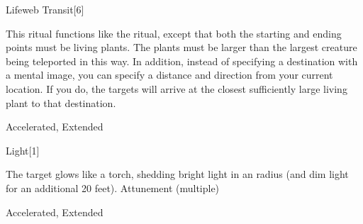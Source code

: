 \begin{spellsection}{Lifeweb Transit}[6]
\begin{spellcontent}
\begin{spelltargetinginfo}
\end{spelltargetinginfo}
\begin{spelleffects}
\spelleffect
This ritual functions like the  ritual, except that both the starting and ending points must be living plants.
The plants must be larger than the largest creature being teleported in this way.
In addition, instead of specifying a destination with a mental image, you can specify a distance and direction from your current location.
If you do, the targets will arrive at the closest sufficiently large living plant to that destination.
\end{spelleffects}
\end{spellcontent}
\begin{spellfooter}
 Accelerated, Extended
\end{spellfooter}
\begin{spellsubcontent}
\end{spellsubcontent}
\end{spellsection}
\begin{spellsection}{Light}[1]
\begin{spellcontent}
\begin{spelltargetinginfo}
\end{spelltargetinginfo}
\begin{spelleffects}
\spelleffect
The target glows like a torch, shedding bright light in an \areamed radius (and dim light for an additional 20 feet).
\spelldur Attunement (multiple)
\end{spelleffects}
\end{spellcontent}
\begin{spellfooter}
 Accelerated, Extended
\end{spellfooter}
\begin{spellsubcontent}
\end{spellsubcontent}
\end{spellsection}
